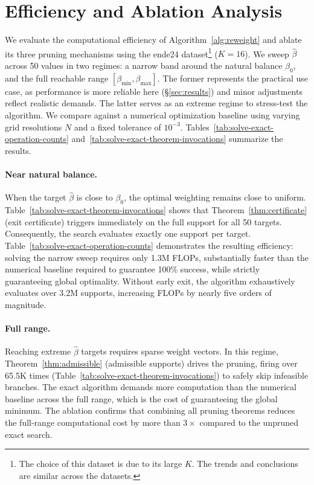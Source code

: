 \documentclass[11pt]{article}
\begin{document}
\section{Efficiency and Ablation Analysis}\label{sec:comp}

We evaluate the computational efficiency of Algorithm~\ref{alg:reweight} and ablate its three pruning mechanisms using the ende24 dataset\footnote{The choice of this dataset is due to its large $K$. The trends and conclusions are similar across the datasets.} ($K=16$). We sweep $\hat\beta$ across 50 values in two regimes: a narrow band around the natural balance $\beta_0$, and the full reachable range $[\beta_{\min}, \beta_{\max}]$. The former represents the practical use case, as performance is more reliable here (\S\ref{sec:results}) and minor adjustments reflect realistic demands. The latter serves as an extreme regime to stress-test the algorithm. We compare against a numerical optimization baseline using varying grid resolutions $N$ and a fixed tolerance of $10^{-3}$. Tables~\ref{tab:solve-exact-operation-counts} and~\ref{tab:solve-exact-theorem-invocations} summarize the results.

\paragraph{Near natural balance.}
When the target $\hat\beta$ is close to $\beta_0$, the optimal weighting remains close to uniform. Table~\ref{tab:solve-exact-theorem-invocations} shows that Theorem~\ref{thm:certificate} (exit certificate) triggers immediately on the full support for all 50 targets. Consequently, the search evaluates exactly one support per target. Table~\ref{tab:solve-exact-operation-counts} demonstrates the resulting efficiency: solving the narrow sweep requires only 1.3M FLOPs, substantially faster than the numerical baseline required to guarantee 100\% success, while strictly guaranteeing global optimality. Without early exit, the algorithm exhaustively evaluates over 3.2M supports, increasing FLOPs by nearly five orders of magnitude.

\paragraph{Full range.}
Reaching extreme $\hat\beta$ targets requires sparse weight vectors. In this regime, Theorem~\ref{thm:admissible} (admissible supports) drives the pruning, firing over 65.5K times (Table~\ref{tab:solve-exact-theorem-invocations}) to safely skip infeasible branches. The exact algorithm demands more computation than the numerical baseline across the full range, which is the cost of guaranteeing the global minimum. The ablation confirms that combining all pruning theorems reduces the full-range computational cost by more than $3\times$ compared to the unpruned exact search.
\end{document}
